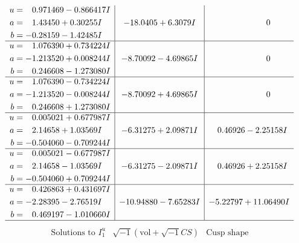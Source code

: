 \documentclass[1p]{elsarticle_modified}
\theoremstyle{definition}
\newcommand{\I}{\sqrt{-1}}
\begin{document}
$$\begin{array}{c|c|c}
\begin{aligned}
u &= \phantom{-}0.971469 - 0.866417 I \\
a &= \phantom{-}1.43450 + 0.30255 I \\
b &= -0.28159 - 1.42485 I\end{aligned}
 & -18.0405 + 6.3079 I & \phantom{-0.000000 } 0 \\ \hline\begin{aligned}
u &= \phantom{-}1.076390 + 0.734224 I \\
a &= -1.213520 + 0.008244 I \\
b &= \phantom{-}0.246608 - 1.273080 I\end{aligned}
 & -8.70092 - 4.69865 I & \phantom{-0.000000 } 0 \\ \hline\begin{aligned}
u &= \phantom{-}1.076390 - 0.734224 I \\
a &= -1.213520 - 0.008244 I \\
b &= \phantom{-}0.246608 + 1.273080 I\end{aligned}
 & -8.70092 + 4.69865 I & \phantom{-0.000000 } 0 \\ \hline\begin{aligned}
u &= \phantom{-}0.005021 + 0.677987 I \\
a &= \phantom{-}2.14658 + 1.03569 I \\
b &= -0.504060 - 0.709244 I\end{aligned}
 & -6.31275 + 2.09871 I & \phantom{-}0.46926 - 2.25158 I \\ \hline\begin{aligned}
u &= \phantom{-}0.005021 - 0.677987 I \\
a &= \phantom{-}2.14658 - 1.03569 I \\
b &= -0.504060 + 0.709244 I\end{aligned}
 & -6.31275 - 2.09871 I & \phantom{-}0.46926 + 2.25158 I \\ \hline\begin{aligned}
u &= \phantom{-}0.426863 + 0.431697 I \\
a &= -2.28395 - 2.76519 I \\
b &= \phantom{-}0.469197 - 1.010660 I\end{aligned}
 & -10.94880 - 7.65283 I & -5.22797 + 11.06490 I\\
 \hline 
 \end{array}$$\newpage$$\begin{array}{c|c|c}  
\text{Solutions to }I^u_{1}& \I (\text{vol} + \sqrt{-1}CS) & \text{Cusp shape}\\
 \hline 
\begin{aligned}

\end{aligned}
\end{array}$$
\end{document}
